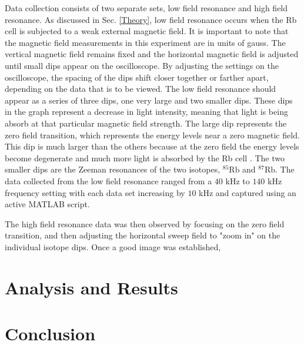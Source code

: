 \documentclass[
 reprint,
linenumbers,
aps,amsmath
]{revtex4-2}
\begin{document}
Data collection consists of two separate sets, low field resonance and high field resonance. As discussed in Sec. \ref{Theory}, low field resonance occurs when the Rb cell is subjected to a weak external magnetic field. It is important to note that the magnetic field measurements in this experiment are in units of gauss. The vertical magnetic field remains fixed and the horizontal magnetic field is adjusted until small dips appear on the oscilloscope. By adjusting the settings on the oscilloscope, the spacing of the dips shift closer together or farther apart, depending on the data that is to be viewed. The low field resonance should appear as a series of three dips, one very large and two smaller dips. These dips in the graph represent a decrease in light intensity, meaning that light is being absorb at that particular magnetic field strength. The large dip represents the zero field transition, which represents the energy levels near a zero magnetic field. This dip is much larger than the others because at the zero field the energy levels become degenerate and much more light is absorbed by the Rb cell \cite{Foot_AtomicPhys}. The two smaller dips are the Zeeman resonances of the two isotopes, $^85\mathrm{Rb}$ and $^87\mathrm{Rb}$. The data collected from the low field resonance ranged from a $40$ kHz to $140$ kHz frequency setting with each data set increasing by $10$ kHz and captured using an active MATLAB script.

The high field resonance data was then observed by focusing on the zero field transition, and then adjusting the horizontal sweep field to "zoom in" on the individual isotope dips. Once a good image was established,

\section{Analysis and Results} \label{results}


\section{Conclusion} \label{conclusion}


\end{document}
